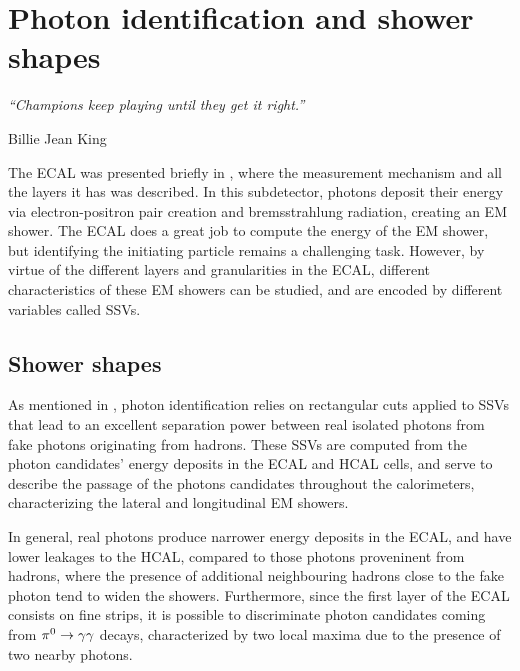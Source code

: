 \chapter{Photon identification and shower shapes}
\label{ch:pid_ss}
\epigraph{\emph{“Champions keep playing until they get it right.”}}{Billie Jean King}


The \ac{ECAL} was presented briefly in \Sect{\ref{subsubsec:atlas:atlas:cals:ecal}}, where the measurement mechanism and all the layers it has was described. In this subdetector, photons deposit their energy via electron-positron pair creation and bremsstrahlung radiation, creating an \ac{EM} shower. The \ac{ECAL} does a great job to compute the energy of the \ac{EM} shower, but identifying the initiating particle remains a challenging task. 
However, by virtue of the different layers and granularities in the \ac{ECAL}, different characteristics of these \ac{EM} showers can be studied, and are encoded by different variables called \acfp{SSV}.







\section{Shower shapes}
\label{sec:pid_ss:ss}

As mentioned in \Sect{\ref{subsec:objects:egamma:id}}, photon identification relies on rectangular cuts applied to \acp{SSV} that lead to an excellent separation power between real isolated photons from fake photons originating from hadrons. These \acp{SSV} are computed from the photon candidates' energy deposits in the \ac{ECAL} and \ac{HCAL} cells, and serve to describe the passage of the photons candidates throughout the calorimeters, characterizing the lateral and longitudinal \ac{EM} showers.

In general, real photons produce narrower energy deposits in the \ac{ECAL}, and have lower leakages to the \ac{HCAL}, compared to those photons proveninent from hadrons, where the presence of additional neighbouring hadrons close to the fake photon tend to widen the showers. Furthermore, since the first layer of the \ac{ECAL} consists on fine strips, it is possible to discriminate photon candidates coming from \(\pi^{0}\rightarrow\gamma\gamma\) decays, characterized by two local maxima due to the presence of two nearby photons.

